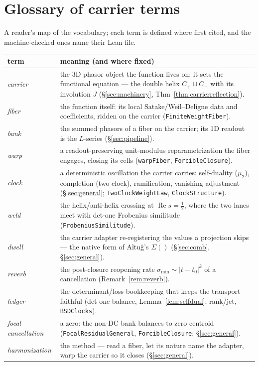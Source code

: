 \documentclass[11pt]{article}
\theoremstyle{definition}
\renewcommand{\Re}{\operatorname{Re}}
\begin{document}
\section*{Glossary of carrier terms}
\noindent A reader's map of the vocabulary; each term is defined where first cited, and the machine-checked ones
name their Lean file.
\begin{center}
\small
\begin{tabular}{@{}lp{}@{}}
\toprule
term & meaning (and where fixed) \\
\midrule
\emph{carrier} & the $3$D phasor object the function lives on; it sets the functional equation --- the double
helix $C_+\sqcup C_-$ with its involution $J$ (\S\ref{sec:machinery}, Thm~\ref{thm:carrierreflection}). \\
\emph{fiber} & the function itself: its local Satake/Weil--Deligne data and coefficients, ridden on the carrier
(\texttt{FiniteWeightFiber}). \\
\emph{bank} & the summed phasors of a fiber on the carrier; its $1$D readout is the $L$-series
(\S\ref{sec:pipeline}). \\
\emph{warp} & a readout-preserving unit-modulus reparametrization the fiber engages, closing its cells
(\texttt{warpFiber}, \texttt{ForcibleClosure}). \\
\emph{clock} & a deterministic oscillation the carrier carries: self-duality ($\mu_2$), completion (two-clock),
ramification, vanishing-adjustment (\S\ref{sec:general}; \texttt{TwoClockWeightLaw}, \texttt{ClockStructure}). \\
\emph{weld} & the helix/anti-helix crossing at $\Re s=\tfrac12$, where the two lanes meet with det-one Frobenius
similitude (\texttt{FrobeniusSimilitude}). \\
\emph{dwell} & the carrier adapter re-registering the values a projection skips --- the native form of
Altu\u{g}'s $\Sigma()$ (\S\ref{sec:comb},\,\S\ref{sec:general}). \\
\emph{reverb} & the post-closure reopening rate $\sigma_{\min}\sim|t-t_0|^{k}$ of a cancellation
(Remark~\ref{rem:reverb}). \\
\emph{ledger} & the determinant/loss bookkeeping that keeps the transport faithful (det-one balance,
Lemma~\ref{lem:selfdual}; rank/jet, \texttt{BSDClocks}). \\
\emph{focal cancellation} & a zero: the non-DC bank balances to zero centroid (\texttt{FocalResidualGeneral},
\texttt{ForcibleClosure}; \S\ref{sec:general}). \\
\emph{harmonization} & the method --- read a fiber, let its nature name the adapter, warp the carrier so it
closes (\S\ref{sec:general}). \\
\bottomrule
\end{tabular}
\end{center}
\end{document}
